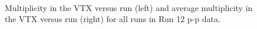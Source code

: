 \documentclass[12pt]{article}
\begin{document}
\begin{figure}[t!]
\begin{center}
 \\
  \caption{Multiplicity in the VTX versus run (left) and average multiplicity in the VTX versus run (right) for all runs in Run 12 p-p data.}
  \label{fig:VTXMult}
\end{center}
\end{figure}  
\end{document}
